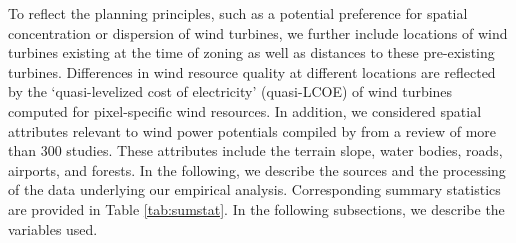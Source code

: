 \documentclass[review, a4paper, 12pt, authoryear, times]{elsarticle}
\begin{document}
To reflect the planning principles, such as a potential preference for spatial concentration or dispersion of wind turbines, we further include locations of wind turbines existing at the time of zoning as well as distances to these pre-existing turbines. 
Differences in wind resource quality at different locations are reflected by the `quasi-levelized cost of electricity' (quasi-LCOE) of wind turbines computed for pixel-specific wind resources.
In addition, we considered spatial attributes relevant to wind power potentials compiled by \cite{McKenna2022} from a review of more than 300 studies.
These attributes include the terrain slope, water bodies, roads, airports, and forests.
In the following, we describe the sources and the processing of the data underlying our empirical analysis. 
Corresponding summary statistics are provided in Table \ref{tab:sumstat}. In the following subsections, we describe the variables used.
\end{document}
